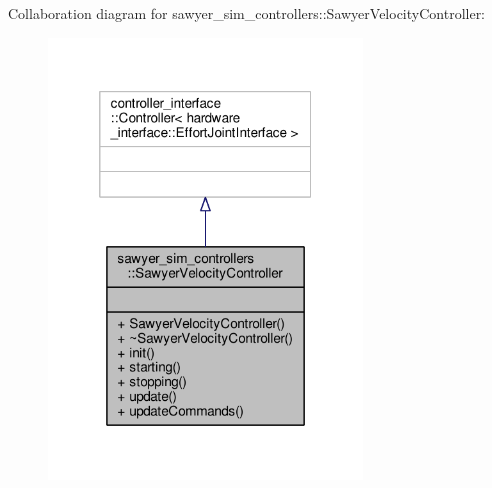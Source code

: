 Collaboration diagram for sawyer\-\_\-sim\-\_\-controllers\-:\-:Sawyer\-Velocity\-Controller\-:\nopagebreak
\begin{figure}[H]
\begin{center}
\leavevmode
\includegraphics[width=236pt]{classsawyer__sim__controllers_1_1_sawyer_velocity_controller__coll__graph}
\end{center}
\end{figure}
